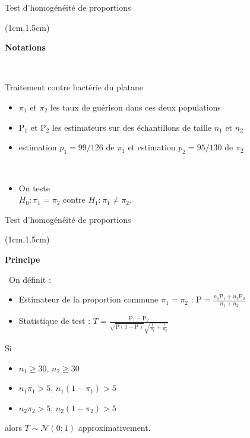 \documentclass{beamer}
\begin{document}

\begin{frame}{Test d'homogénéité de proportions}
\begin{textblock*}{\textwidth}(1cm,1.5cm)

\begin{center}{\bf \Large Notations} \end{center}



 \
 
 Traitement contre bactérie du platane

\begin{itemize}
\item $\pi_1$ et $\pi_2$ les taux de guérison dans ces deux populations 
\item  $\mathrm{P}_1$ et $\mathrm{P}_2$ les estimateurs sur des échantillons de taille $n_1$  et $n_2$
\item  estimation $p_1=99/126$ de $\pi_1$ et  estimation $p_2 =95/130$ de $\pi_2$

\
\item On teste \\ 
$H_0 : \pi_1=\pi_2$ contre $H_1 : \pi_1 \neq \pi_2$.
\end{itemize}

\end{textblock*}

\end{frame}
 

\begin{frame}{Test d'homogénéité de proportions}
\begin{textblock*}{\textwidth}(1cm,1.5cm)

\begin{center}{\bf \Large Principe  } \end{center}



 \
On définit :  
\begin{itemize}
\item Estimateur de la proportion commune $\pi_1=\pi_2$ : 
$\mathrm{P}=\frac{n_1 \mathrm{P}_1 + n_2 \mathrm{P}_2}{n_1+n_2}$
\item Statistique de test :
$
T=\frac{\mathrm{P}_1-\mathrm{P}_2}{\sqrt{\mathrm{P}(1-\mathrm{P})} \sqrt{\frac{1}{n_1} + \frac{1}{n_2}} }$
\end{itemize}

Si
\begin{itemize}
\item $n_1\geq 30$, $n_2\geq 30$ 
\item  $n_1 \pi_1>5$,  $n_1(1-\pi_1)>5$
\item $n_2 \pi_2>5$,  $n_2(1-\pi_2)>5$
\end{itemize}

alors $T\sim \mathcal{N}(0;1)$ approximativement.

\end{textblock*}

\end{frame}
\end{document}
